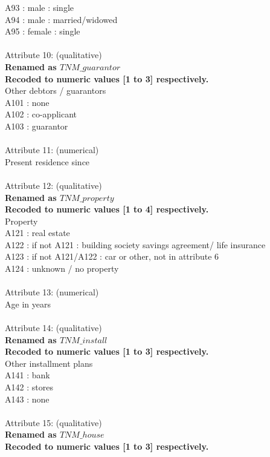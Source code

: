 \documentclass{article}\usepackage[]{graphicx}\usepackage[]{color}
\begin{document}
A93 : male : single\\
A94 : male : married/widowed\\
A95 : female : single\\
\\
Attribute 10: (qualitative)\\
\textbf{Renamed as \textit{$TNM\_ guarantor$}}\\
\textbf{Recoded to numeric values [1 to 3] respectively.}\\
Other debtors / guarantors\\
A101 : none\\
A102 : co-applicant\\
A103 : guarantor\\
\\
Attribute 11: (numerical)\\
Present residence since\\
\\
Attribute 12: (qualitative)\\
\textbf{Renamed as \textit{$TNM\_ property$}}\\
\textbf{Recoded to numeric values [1 to 4] respectively.}\\
Property\\
A121 : real estate\\
A122 : if not A121 : building society savings agreement/ life insurance\\
A123 : if not A121/A122 : car or other, not in attribute 6\\
A124 : unknown / no property\\
\\
Attribute 13: (numerical)\\
Age in years\\
\\
Attribute 14: (qualitative)\\
\textbf{Renamed as \textit{$TNM\_ install$}}\\
\textbf{Recoded to numeric values [1 to 3] respectively.}\\
Other installment plans\\
A141 : bank\\
A142 : stores\\
A143 : none\\
\\
Attribute 15: (qualitative)\\
\textbf{Renamed as \textit{$TNM\_ house$}}\\
\textbf{Recoded to numeric values [1 to 3] respectively.}\\
\end{document}

